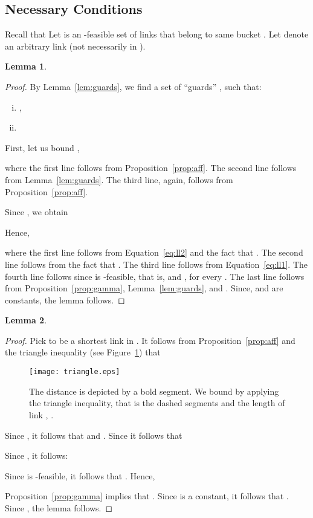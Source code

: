 \documentclass[11pt]{article}
\newenvironment{proof sketch}{\noindent {\bf Proof sketch:} }{\hfill \qed}
\newtheorem{lemma}{Lemma}
\newcommand{\sinr}{\text{\sc{sinr}}}
\begin{document}
\subsection{Necessary Conditions}
Recall that Let  is an \sinr-feasible set of links that
belong to same bucket .
Let  denote an arbitrary link (not
necessarily in ).
\begin{lemma}\label{lemma:in degree}
  
\end{lemma}
\begin{proof}
  By Lemma~\ref{lem:guards}, we find a set of ``guards'' , such that:
\begin{enumerate}[(i)]
        \item \label{item: g6} ,
        \item \label{item:gsidt}
    \end{enumerate}
First, let us bound ,


where the first line follows from Proposition~\ref{prop:aff}. The second line follows from
Lemma~\ref{lem:guards}. The third line, again, follows from Proposition~\ref{prop:aff}.


Since , we obtain




Hence,

where the first line follows from Equation~\ref{eq:ll2} and the fact that .
The second line follows from the fact that .
The third line follows from Equation~\ref{eq:ll1}.
The fourth line follows since  is \sinr-feasible, that is,   and , for every . The last line follows from Proposition~\ref{prop:gamma}, Lemma~\ref{lem:guards}, and .
Since,  and  are constants, the lemma follows.
\end{proof}
\begin{lemma}\label{lemma:out degree}
  
\end{lemma}
\begin{proof}
Pick  to be a shortest link in .
It follows from Proposition~\ref{prop:aff} and the triangle inequality (see Figure~\ref{fig:triangle}) that

\begin{figure}[H]
  \centering
    \texttt{[image: triangle.eps]}
    \caption{The distance  is depicted by a bold segment. We bound 
    by applying the triangle inequality, that is the dashed segments and the length of link , .}
  \label{fig:triangle}
\end{figure}

Since , it follows that  and  .
Since  it follows that

Since , it follows:

Since  is \sinr-feasible, it follows that . Hence,

Proposition~\ref{prop:gamma} implies that .
Since  is a constant, it follows that .
Since , the lemma follows.
\end{proof}
\end{document}
